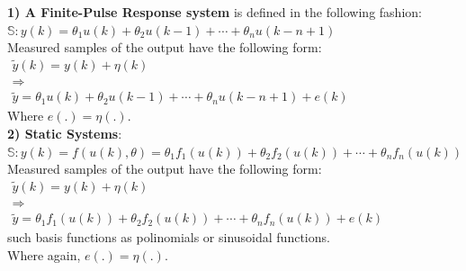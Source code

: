 \begin{example}
\textbf{1) A Finite-Pulse Response system} is defined in the following fashion:\\
    \(\mathbb{S}: y(k) = \theta_1 u(k) + \theta_2 u(k-1) + \cdots + \theta_n u(k-n+1)\)\\
  
Measured samples of the output have the following form:\\
\(
\begin{array}{l}
\tilde{y}(k) = y(k) + \eta(k)\\
\Rightarrow\\
\tilde{y} = \theta_1 u(k) + \theta_2 u(k-1) + \cdots + \theta_n u(k-n+1) + e(k)
\end{array}
\)\\
Where \(e(.) = \eta(.) \).\\

\textbf{2) Static Systems}: \\
\(\mathbb{S}: y(k) = f(u(k),\theta) = \theta_1 f_1(u(k)) + \theta_2 f_2(u(k)) + \cdots + \theta_n f_n(u(k))\)\\
Measured samples of the output have the following form:\\
\(
\begin{array}{l}
\tilde{y}(k) = y(k) + \eta(k)\\
\Rightarrow\\
\tilde{y} = \theta_1 f_1(u(k)) + \theta_2 f_2(u(k)) + \cdots + \theta_n f_n(u(k)) + e(k)
\end{array}
\)\\
such basis functions as polinomials or sinusoidal functions.\\
Where again, \(e(.) = \eta(.) \).\\
\end{example}

